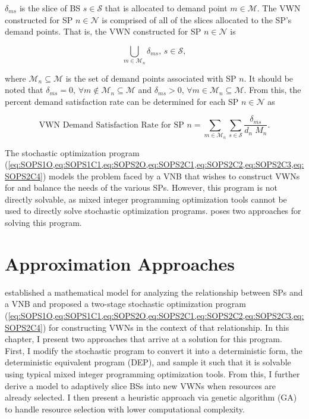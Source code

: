 \documentclass[12pt,dvipsnames]{report}
\begin{document}
$\delta_{ms}$ is the slice of BS $s \in \mathcal{S}$ that is allocated to demand point $m \in \mathcal{M}$.  The VWN constructed for SP $n \in \mathcal{N}$ is comprised of all of the slices allocated to the SP's demand points.  That is, the VWN constructed for SP $n \in \mathcal{N}$ is 

\begin{equation} \label{eq:delta_union_VWN}
	\bigcup_{m \in \mathcal{M}_n} \delta_{ms},\, s \in \mathcal{S},
\end{equation}

\noindent where $\mathcal{M}_n \subseteq \mathcal{M}$ is the set of demand points associated with SP $n$.  It should be noted that $\delta_{ms} = 0,\, \forall m \not\in \mathcal{M}_n \subseteq \mathcal{M}$ and $\delta_{ms} > 0,\, \forall m \in \mathcal{M}_n \subseteq \mathcal{M}$.  From this, the percent demand satisfaction rate can be determined for each SP $n \in \mathcal{N}$ as

\begin{equation} \label{eq:VWN_demand_sat}
	\text{VWN Demand Satisfaction Rate for SP $n$} = \sum_{m \in \mathcal{M}_n} \sum_{s \in \mathcal{S}} \frac{\delta_{ms}}{d_n \; M_n}.
\end{equation}

The stochastic optimization program (\cref{eq:SOPS1O,eq:SOPS1C1,eq:SOPS2O,eq:SOPS2C1,eq:SOPS2C2,eq:SOPS2C3,eq:SOPS2C4}) models the problem faced by a VNB that wishes to construct VWNs for and balance the needs of the various SPs.  However, this program is not directly solvable, as mixed integer programming optimization tools cannot be used to directly solve stochastic optimization programs.   poses two approaches for solving this program.

\pagebreak
\chapter{Approximation Approaches} \label{ch:approaches}

 established a mathematical model for analyzing the relationship between SPs and a VNB and proposed a two-stage stochastic optimization program (\cref{eq:SOPS1O,eq:SOPS1C1,eq:SOPS2O,eq:SOPS2C1,eq:SOPS2C2,eq:SOPS2C3,eq:SOPS2C4}) for constructing VWNs in the context of that relationship.  In this chapter, I present two approaches that arrive at a solution for this program.  First, I modify the stochastic program to convert it into a deterministic form, the deterministic equivalent program (DEP), and sample it such that it is solvable using typical mixed integer programming optimization tools.  From this, I further derive a model to adaptively slice BSs into new VWNs when resources are already selected.  I then present a heuristic approach via genetic algorithm (GA) to handle resource selection with lower computational complexity.
\end{document}
